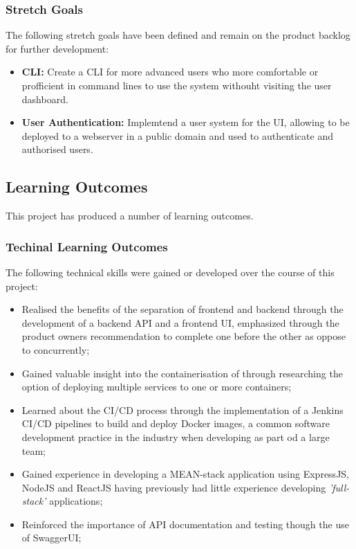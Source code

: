   
  \subsubsection{Stretch Goals}
  The following stretch goals have been defined and remain on the product backlog for further development:
  
  \begin{itemize}
    \item \textbf{CLI:} Create a CLI for more advanced users who more comfortable or profficient in command lines to use the system withouht visiting the user dashboard.
    \item \textbf{User Authentication: } Implemtend a user system for the UI, allowing to be deployed to a webserver in a public domain and used to authenticate and authorised users.
  \end{itemize}
  

	\subsection{Learning Outcomes}
  This project has produced a number of learning outcomes.
  
  \subsubsection{Techinal Learning Outcomes}
  The following technical skills were gained or developed over the course of this project:
  
  \begin{itemize}
    \item Realised the benefits of the separation of frontend and backend through the development of a backend API and a frontend UI, emphasized through the product owners recommendation to complete one before the other as oppose to concurrently;
    \item Gained valuable insight into the containerisation of through researching the option of deploying multiple services to one or more containers;
    \item Learned about the CI/CD process through the implementation of a Jenkins CI/CD pipelines to build and deploy Docker images, a common software development practice in the industry when developing as part od a large team;
    \item Gained experience in developing a MEAN-stack application using ExpressJS, NodeJS and ReactJS having previously had little experience developing \textit{'full-stack'} applications;
    \item Reinforced the importance of API documentation and testing though the use of SwaggerUI;
  \end{itemize}
  
